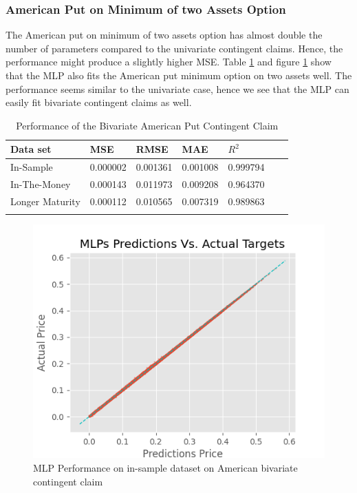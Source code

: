 \subsubsection{American Put on Minimum of two Assets Option}
The American put on minimum of two assets option has almost double the number of parameters compared to the univariate contingent claims. Hence, the performance might produce a slightly higher MSE. Table \ref{tab:AmerMinPerformanceComparision} and figure \ref{fig:MLPInSampleAmerMin} show that the MLP also fits the American put minimum option on two assets well. The performance seems similar to the univariate case, hence we see that the MLP can easily fit bivariate contingent claims as well. \\ 

\begin{table}[th]
\caption{Performance of the Bivariate American Put Contingent Claim}
\label{tab:AmerMinPerformanceComparision}
\centering
\begin{tabular}{l l l l l l l }
\toprule
\textbf{Data set} & \textbf{MSE} & \textbf{RMSE} & \textbf{MAE} & \textbf{$R^2$} \\
\midrule
In-Sample & 0.000002 & 0.001361 & 0.001008 & 0.999794\\
In-The-Money & 0.000143 & 0.011973 & 0.009208 & 0.964370\\
Longer Maturity & 0.000112 & 0.010565 & 0.007319 & 0.989863\\
\bottomrule\\
\end{tabular}
\end{table}

\begin{figure}[H]
\centering
\includegraphics{Figures/inSampleAmerMinP.png}
\decoRule
\caption[MLP Performance for In-sample Dataset American Put on minimum on two Assets]{MLP Performance on in-sample dataset on American bivariate contingent claim}
\label{fig:MLPInSampleAmerMin}
\end{figure}


